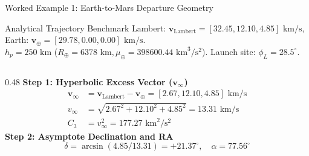\documentclass[aspectratio=169, 10pt]{beamer}
\begin{document}
\begin{frame}{Worked Example 1: Earth-to-Mars Departure Geometry}
    \begin{exampleblock}{Analytical Trajectory Benchmark}
        \scriptsize
        Lambert: $\mathbf{v}_{\text{Lambert}} = [32.45, 12.10, 4.85]\text{ km/s}$, Earth: $\mathbf{v}_{\oplus} = [29.78, 0.00, 0.00]\text{ km/s}$. \\
        $h_p = 250\text{ km}$ ($R_{\oplus} = 6378\text{ km}, \mu_{\oplus} = 398600.44\text{ km}^3/\text{s}^2$). Launch site: $\phi_L = 28.5^\circ$.
    \end{exampleblock}

    \vspace{-0.15cm}

    \begin{columns}[t]
        \begin{column}{0.48\textwidth}
            \scriptsize
            \textbf{Step 1: Hyperbolic Excess Vector ($\mathbf{v}_\infty$)}
            \begin{align*}
                \mathbf{v}_\infty &= \mathbf{v}_{\text{Lambert}} - \mathbf{v}_{\oplus} = [2.67, 12.10, 4.85]\text{ km/s} \\
                v_\infty &= \sqrt{2.67^2 + 12.10^2 + 4.85^2} = \mathbf{13.31}\text{ km/s} \\
                C_3 &= v_\infty^2 = \mathbf{177.27}\text{ km}^2/\text{s}^2
            \end{align*}
            \vspace{-0.15cm}
            \textbf{Step 2: Asymptote Declination and RA}
            \begin{equation*}
                \delta = \arcsin(4.85/13.31) = +\mathbf{21.37}^\circ, \quad \alpha = \mathbf{77.56}^\circ
            \end{equation*}
        \end{column}


\end{columns}
\end{frame}
\end{document}
